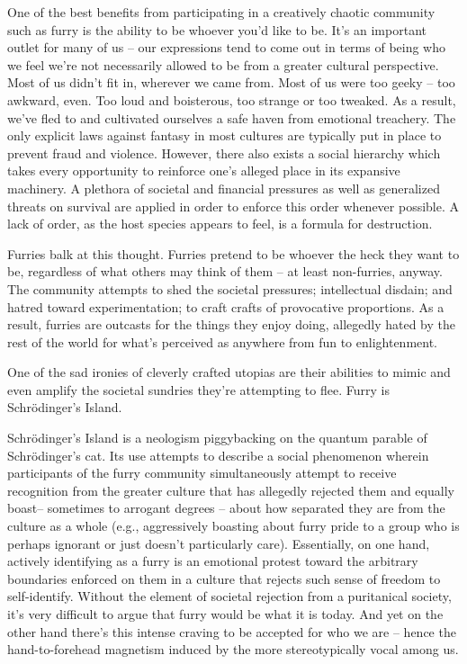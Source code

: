 
One of the best benefits from participating in a creatively chaotic community such as furry is the ability to be whoever you'd like to be. It's an important outlet for many of us -- our expressions tend to come out in terms of being who we feel we're not necessarily allowed to be from a greater cultural perspective. Most of us didn't fit in, wherever we came from. Most of us were too geeky -- too awkward, even. Too loud and boisterous, too strange or too tweaked. As a result, we've fled to and cultivated ourselves a safe haven from emotional treachery. The only explicit laws against fantasy in most cultures are typically put in place to prevent fraud and violence. However, there also exists a social hierarchy which takes every opportunity to reinforce one's alleged place in its expansive machinery. A plethora of societal and financial pressures as well as generalized threats on survival are applied in order to enforce this order whenever possible. A lack of order, as the host species appears to feel, is a formula for destruction.

Furries balk at this thought. Furries pretend to be whoever the heck they want to be, regardless of what others may think of them -- at least non-furries, anyway. The community attempts to shed the societal pressures; intellectual disdain; and hatred toward experimentation; to craft crafts of provocative proportions. As a result, furries are outcasts for the things they enjoy doing, allegedly hated by the rest of the world for what's perceived as anywhere from fun to enlightenment.

One of the sad ironies of cleverly crafted utopias are their abilities to mimic and even amplify the societal sundries they're attempting to flee. Furry is Schr\"{o}dinger's Island.

Schr\"{o}dinger's Island is a neologism piggybacking on the quantum parable of Schr\"{o}dinger's cat. Its use attempts to describe a social phenomenon wherein participants of the furry community simultaneously attempt to receive recognition from the greater culture that has allegedly rejected them and equally boast-- sometimes to arrogant degrees -- about how separated they are from the culture as a whole (e.g., aggressively boasting about furry pride to a group who is perhaps ignorant or just doesn't particularly care). Essentially, on one hand, actively identifying as a furry is an emotional protest toward the arbitrary boundaries enforced on them in a culture that rejects such sense of freedom to self-identify. Without the element of societal rejection from a puritanical society, it's very difficult to argue that furry would be what it is today. And yet on the other hand there's this intense craving to be accepted for who we are -- hence the hand-to-forehead magnetism induced by the more stereotypically vocal among us.

